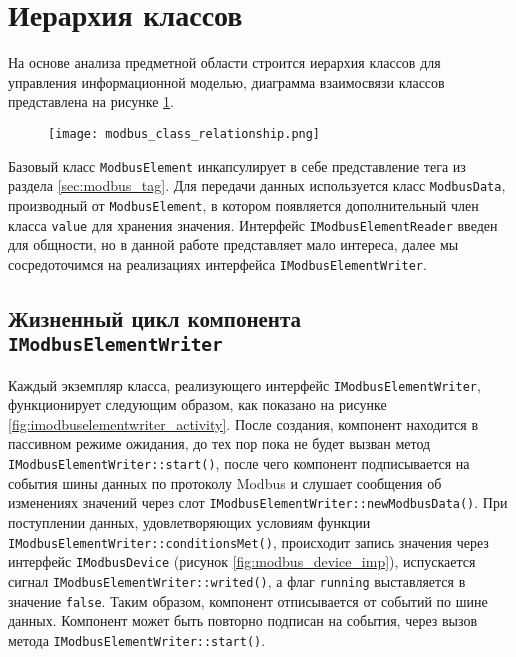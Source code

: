 \section{Иерархия классов}
На основе анализа предметной области строится иерархия классов для управления информационной моделью,
диаграмма взаимосвязи классов представлена на рисунке \ref{fig:modbus_class_uml}. 
\begin{landscape}
    \begin{center}
        \begin{figure}[h!]
            \texttt{[image: modbus\_class\_relationship.png]}
            \caption{}\label{fig:modbus_class_uml}
        \end{figure}
    \end{center}
\end{landscape}
Базовый класс \texttt{ModbusElement} инкапсулирует в себе представление тега из раздела \ref{sec:modbus_tag}.
Для передачи данных используется класс \texttt{ModbusData}, производный от \texttt{ModbusElement},
в котором появляется дополнительный член класса \texttt{value} для хранения значения.
Интерфейс \texttt{IModbusElementReader} введен для общности, но в данной работе представляет мало интереса, далее мы сосредоточимся 
на реализациях интерфейса \texttt{IModbusElementWriter}.


\subsection{Жизненный цикл компонента \texttt{IModbusElementWriter}}
Каждый экземпляр класса, реализующего интерфейс \texttt{IModbusElementWriter},
функционирует следующим образом, как показано на рисунке \ref{fig:imodbuselementwriter_activity}.
После создания, компонент находится в пассивном режиме ожидания, до тех пор пока не будет вызван
метод \texttt{IModbusElementWriter::start()}, после чего компонент подписывается на события шины данных по протоколу Modbus
и слушает сообщения об изменениях значений через слот \texttt{IModbusElementWriter::newModbusData()}.
При поступлении данных, удовлетворяющих условиям функции \texttt{IModbusElementWriter::conditionsMet()},
происходит запись значения через интерфейс \texttt{IModbusDevice} (рисунок \ref{fig:modbus_device_imp}),
испускается сигнал \texttt{IModbusElementWriter::writed()},
а флаг \texttt{running} выставляется в значение \texttt{false}.
Таким образом, компонент отписывается от событий по шине данных.
Компонент может быть повторно подписан на события, через вызов метода \texttt{IModbusElementWriter::start()}.

